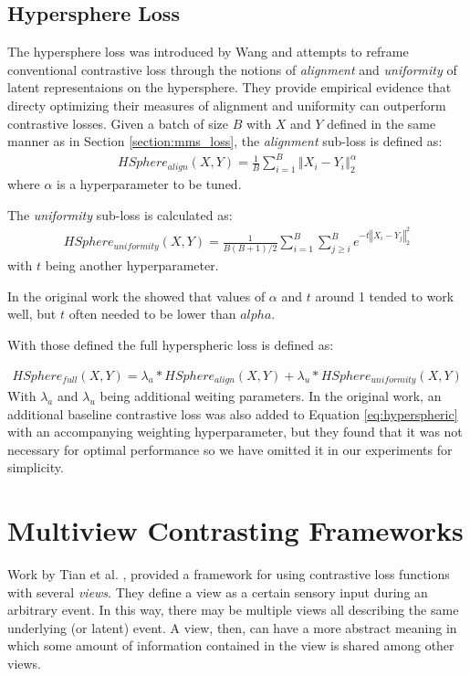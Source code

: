 \subsection{Hypersphere Loss}
The hypersphere loss was introduced by Wang \cite{wang2020understanding} and attempts to reframe conventional contrastive loss through the notions of \textit{alignment} and \textit{uniformity} of latent representaions on the hypersphere.
They provide empirical evidence that directy optimizing their measures of alignment and uniformity can outperform contrastive losses.
Given a batch of size $B$ with $X$ and $Y$ defined in the same manner as in Section \ref{section:mms_loss}, the \textit{alignment} sub-loss is defined as:
\begin{align*}
    HSphere_{align}(X,Y) = \frac{1}{B}\sum_{i=1}^B \left\Vert X_i - Y_i\right\Vert_2^\alpha
\end{align*}
where $\alpha$ is a hyperparameter to be tuned.

The \textit{uniformity} sub-loss is calculated as:
\begin{align*}
    HSphere_{uniformity}(X,Y) = \frac{1}{B(B+1)/2}\sum_{i=1}^B\sum_{j\geq i}^B e^{-t\left\Vert X_i - Y_j\right\Vert_2^2}
\end{align*}
with $t$ being another hyperparameter.

In the original work the showed that values of $\alpha$ and $t$ around 1 tended to work well, but $t$ often needed to be lower than $alpha$.

With those defined the full hyperspheric loss is defined as:

\begin{align}
    \label{eq:hyperspheric}
    HSphere_{full}(X,Y) = \lambda_a*HSphere_{align}(X,Y) + \lambda_u*HSphere_{uniformity}(X,Y)
\end{align}
With $\lambda_a$ and $\lambda_u$ being additional weiting parameters.
In the original work, an additional baseline contrastive loss was also added to Equation \ref{eq:hyperspheric} with an accompanying weighting hyperparameter, but they found that it was not necessary for optimal performance so we have omitted it in our experiments for simplicity.


\section{Multiview Contrasting Frameworks}
\label{section:multiview_framework}
Work by Tian et al. \cite{tian2020contrastive}, provided a framework for using contrastive loss functions with several \textit{views}.
They define a view as a certain sensory input during an arbitrary event.  
In this way, there may be multiple views all describing the same underlying (or latent) event.
A view, then, can have a more abstract meaning in which some amount of information contained in the view is shared among other views.

